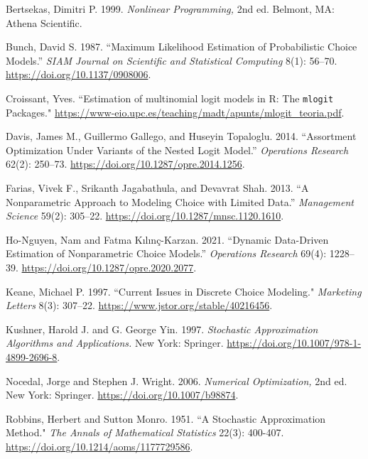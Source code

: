 \documentclass[preprint,12pt,authoryear]{elsarticle}
\begin{document}
\begin{thebibliography}{00}

Bertsekas, Dimitri P. 1999. \emph{Nonlinear Programming,} 2nd ed. Belmont, MA: Athena Scientific. 

Bunch, David S. 1987. ``Maximum Likelihood Estimation of Probabilistic Choice Models.'' \emph{SIAM Journal on Scientific and Statistical Computing} 8(1): 56--70. {\url{https://doi.org/10.1137/0908006}}. 

Croissant, Yves. ``Estimation of multinomial logit models in R: The \texttt{mlogit} Packages." {\url{https://www-eio.upc.es/teaching/madt/apunts/mlogit_teoria.pdf}}. 

Davis, James M.,  Guillermo Gallego, and Huseyin Topaloglu. 2014. ``Assortment Optimization Under Variants of the Nested Logit Model.'' \emph{Operations Research} 62(2): 250--73. {\url{https://doi.org/10.1287/opre.2014.1256}}. 

Farias, Vivek F., Srikanth Jagabathula, and Devavrat Shah. 2013. “A Nonparametric Approach to Modeling Choice with Limited Data.” \emph{Management Science} 59(2): 305--22. {\url{https://doi.org/10.1287/mnsc.1120.1610}}. 

Ho-Nguyen, Nam and Fatma Kılınç-Karzan. 2021. ``Dynamic Data-Driven Estimation of Nonparametric Choice Models.'' \emph{Operations Research} 69(4): 1228--39. {\url{https://doi.org/10.1287/opre.2020.2077}}.

Keane, Michael P. 1997. ``Current Issues in Discrete Choice Modeling." \emph{Marketing Letters} 8(3): 307--22. {\url{https://www.jstor.org/stable/40216456}}.

Kushner, Harold J. and G. George Yin. 1997. \emph{Stochastic Approximation Algorithms and Applications.} New York: Springer. {\url{https://doi.org/10.1007/978-1-4899-2696-8}}.

Nocedal, Jorge and Stephen J. Wright. 2006. \emph{Numerical Optimization,} 2nd ed. New York: Springer. {\url{https://doi.org/10.1007/b98874}}. 

Robbins, Herbert and Sutton Monro. 1951. ``A Stochastic Approximation Method." \emph{The Annals of Mathematical Statistics} 22(3): 400-407. {\url{https://doi.org/10.1214/aoms/1177729586}}. 


\end{thebibliography}
\end{document}
